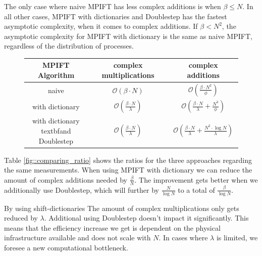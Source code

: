 \documentclass[12pt]{article}
\begin{document}
The only case where naive MPIFT has less complex additions is when $\beta \leq N$. In all other cases, MPIFT with dictionaries and Doublestep has the fastest asymptotic complexity, when it comes to complex additions. If $\beta < N^2$, the asymptotic complexity for MPIFT with dictionary is the same as naive MPIFT, regardless of the distribution of processes. 

\begin{figure} [H]
	\begin{center}
		\begin{tabular}{||c c c||} 
			\hline
			MPIFT Algorithm & complex multiplications & complex additions \\ [0.5ex] 
			\hline\hline
			naive & $\mathcal{O}(\beta\cdot N)$ & $\mathcal{O}(\frac{\beta\cdot N^2}{\phi})$  \\ 
			\hline
			with dictionary & $\mathcal{O}(\frac{\beta\cdot N}{\lambda})$ & $\mathcal{O}(\frac{\beta\cdot N}{\lambda}+\frac{N^3}{\phi})$  \\
			\hline
			\shortstack{with dictionary \\textbf{and} Doublestep} & $\mathcal{O}(\frac{\beta\cdot N}{\lambda})$ &
			$\mathcal{O}(\frac{\beta\cdot N}{\lambda}+\frac{N^2\cdot \log{N}}{\lambda})$  \\ 
			\hline
		\end{tabular}
	\end{center}
\label{fig::comparing}
\end{figure}

Table \ref{fig::comparing_ratio} shows the ratios for the three approaches regarding the same measurements. When using MPIFT with dictionary we can reduce the amount of complex additions needed by $\frac{\beta}{N}$. The improvement gets better when we additionally use Doublestep, which will further by $\frac{N}{\log{N}}$ to a total of $\frac{\beta}{\log{N}}$.

By using shift-dictionaries The amount of complex multiplications only gets reduced by $\lambda$. Additional using Doublestep doesn't impact it significantly. This means that the efficiency increase we get is dependent on the physical infrastructure available and does not scale with $N$. In cases where $\lambda$ is limited, we foresee a new computational bottleneck.
\end{document}
